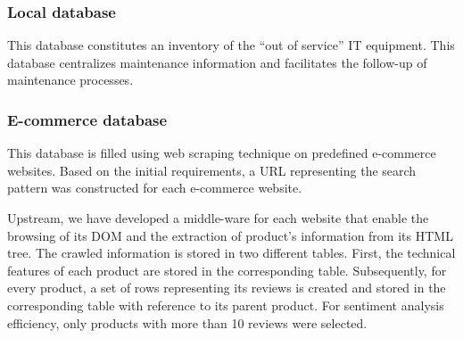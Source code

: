 \documentclass[preprint,3p,onecolumn]{elsarticle}
\begin{document}
\subsubsection{Local database}
\par This database constitutes an inventory of the “out of service” IT equipment.  This database centralizes maintenance information and facilitates the follow-up of maintenance processes.

\subsubsection{E-commerce database}
\par This database is filled using web scraping technique \citep{varela2021web} on predefined e-commerce websites. Based on the initial requirements, a URL representing the search pattern was constructed for each e-commerce website.
\par Upstream, we have developed a middle-ware for each website that enable the browsing of its DOM and the extraction of product’s information from its HTML tree. The crawled information is stored in two different tables. First, the technical features of each product are stored in the corresponding table. Subsequently, for every product, a set of rows representing its reviews is created and stored in the corresponding table with reference to its parent product. For sentiment analysis efficiency, only products with more than 10 reviews were selected.
\end{document}
